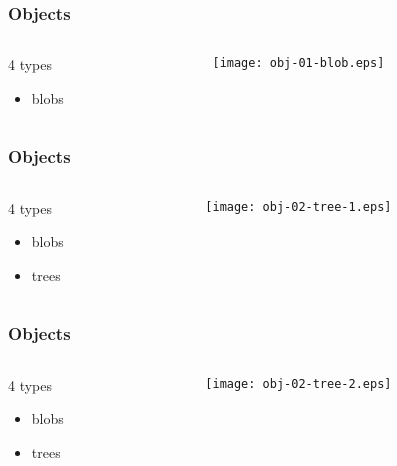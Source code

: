\documentclass[english]{beamer}
\begin{document}
\begin{frame}
\frametitle{Objects}
\begin{columns}[t]
        \begin{column}[T]{.5\textwidth}
                4 types
                \begin{itemize}
                        \item blobs
                \end{itemize}
        \end{column}
        \begin{column}[T]{.5\textwidth}
                \texttt{[image: obj-01-blob.eps]}
        \end{column}
\end{columns}
\end{frame}

\begin{frame}
\frametitle{Objects}
\begin{columns}[t]
        \begin{column}[T]{.5\textwidth}
                4 types
                \begin{itemize}
                        \item blobs
                        \item trees
                \end{itemize}
        \end{column}
        \begin{column}[T]{.5\textwidth}
                \texttt{[image: obj-02-tree-1.eps]}
        \end{column}
\end{columns}
\end{frame}

\begin{frame}
\frametitle{Objects}
\begin{columns}[t]
        \begin{column}[T]{.5\textwidth}
                4 types
                \begin{itemize}
                        \item blobs
                        \item trees
                \end{itemize}
        \end{column}
        \begin{column}[T]{.5\textwidth}
                \texttt{[image: obj-02-tree-2.eps]}
        \end{column}
\end{columns}
\end{frame}
\end{document}
